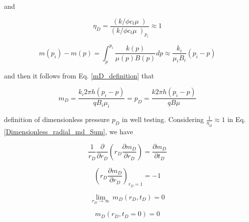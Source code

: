 \documentclass{llncs}
\numberwithin{equation}{section}
\numberwithin{figure}{section}
\numberwithin{table}{section}
\begin{document}
    and

    \begin{equation}
        {{\eta }_{D}}=\frac{\left( {k}/{\phi {{c}_{t}}\mu }\; \right)}{{{\left( {k}/{\phi {{c}_{t}}\mu }\; \right)}_{{{p}_{i}}}}}\approx 1
        \label{assumption}
    \end{equation}

    \begin{equation}
        m\left( {{p}_{i}} \right)-m\left( p \right)=\int_{p}^{{{p}_{i}}}{\frac{k\left( p \right)}{\mu \left( p \right)B\left( p \right)}dp\approx \frac{{{k}_{i}}}{{{\mu }_{i}}{{B}_{i}}}}\left( {{p}_{i}}-p \right)
        \label{assumption_2}
    \end{equation}

    and then it follows from Eq. \ref{mD_definition} that

    \begin{equation}
        {{m}_{D}}=\frac{{{k}_{i}}2\pi h\left( {{p}_{i}}-p \right)}{q{{B}_{i}}{{\mu }_{i}}}={{p}_{D}}=\frac{k 2\pi h\left( {{p}_{i}}-p \right)}{qB\mu }
        \label{mD_to_pD}
    \end{equation}

     definition of dimensionless pressure $p_{D}$ in well testing.
    Considering $\frac{1}{{{\eta }_{D}}}\approx 1$ in Eq. \ref{Dimensionless_radial_md_Sum}, we have

    \begin{equation}
        \frac{1}{{{r}_{D}}}\frac{\partial }{\partial {{r}_{D}}}\left( {{r}_{D}}\frac{\partial {{m}_{D}}}{\partial {{r}_{D}}} \right)=\frac{\partial {{m}_{D}}}{\partial {{t}_{D}}}
        \label{Dimensionless_radial_md_Sum_lin}
    \end{equation}

    \begin{equation}
        {{\left( {{r}_{D}}\frac{\partial {{m}_{D}}}{\partial {{r}_{D}}} \right)}_{{{r}_{D}}=1}}=-1
        \label{Boundary_1_sum_lin}
    \end{equation}

    \begin{equation}
        \underset{{{r}_{D}}\to \infty }{\mathop{\lim }}\,{{m}_{D}}\left( {{r}_{D}},{{t}_{D}} \right)=0
        \label{Boundary_2_sum_lin}
    \end{equation}

    \begin{equation}
        {{m}_{D}}\left( {{r}_{D}},{{t}_{D}}=0 \right)=0
        \label{Initial_con_sum_lin}
    \end{equation}
\end{document}

